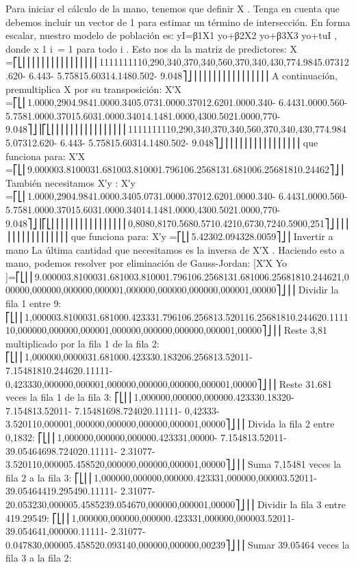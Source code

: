 \documentclass[
]{book}
\begin{document}
Para iniciar el cálculo de la mano, tenemos que definir X . Tenga en cuenta que debemos incluir un vector de 1 para estimar un término de intersección. En forma escalar, nuestro modelo de población es: yI=β1X1 yo+β2X2 yo+β3X3 yo+tuI , donde x 1 i  = 1 para todo i . Esto nos da la matriz de predictores:
X =⎡⎣⎢⎢⎢⎢⎢⎢⎢⎢⎢⎢⎢⎢⎢⎢⎢⎢1111111110,290,340,370,340,560,370,340,430,774.9845.07312.620- 6.443- 5.75815.60314.1480.502- 9.048⎤⎦⎥⎥⎥⎥⎥⎥⎥⎥⎥⎥⎥⎥⎥⎥⎥⎥
A continuación, premultiplica X por su transposición:
X′X =⎡⎣⎢1.0000,2904.9841.0000.3405.0731.0000.37012.6201.0000.340- 6.4431.0000.560- 5.7581.0000.37015.6031.0000.34014.1481.0000,4300.5021.0000,770- 9.048⎤⎦⎥⎡⎣⎢⎢⎢⎢⎢⎢⎢⎢⎢⎢⎢⎢⎢⎢⎢⎢1111111110,290,340,370,340,560,370,340,430,774.9845.07312.620- 6.443- 5.75815.60314.1480.502- 9.048⎤⎦⎥⎥⎥⎥⎥⎥⎥⎥⎥⎥⎥⎥⎥⎥⎥⎥
que funciona para:
X′X =⎡⎣⎢9.000003.8100031.681003.810001.796106.2568131.681006.25681810.24462⎤⎦⎥
También necesitamos X′y :
X′y =⎡⎣⎢1.0000,2904.9841.0000.3405.0731.0000.37012.6201.0000.340- 6.4431.0000.560- 5.7581.0000.37015.6031.0000.34014.1481.0000,4300.5021.0000,770- 9.048⎤⎦⎥⎡⎣⎢⎢⎢⎢⎢⎢⎢⎢⎢⎢⎢⎢⎢⎢⎢⎢0,8080,8170.5680.5710.4210,6730,7240.5900,251⎤⎦⎥⎥⎥⎥⎥⎥⎥⎥⎥⎥⎥⎥⎥⎥⎥⎥
que funciona para:
X′y =⎡⎣⎢5.42302.094328.0059⎤⎦⎥
Invertir a mano
La última cantidad que necesitamos es la inversa de X′X . Haciendo esto a mano, podemos resolver por eliminación de Gauss-Jordan:
{[}X′X \textbar{} Yo {]}=⎡⎣⎢⎢9.000003.8100031.681003.810001.796106.2568131.681006.25681810.244621,000000,000000,000000,000001,000000,000000,000000,000001,00000⎤⎦⎥⎥
Dividir la fila 1 entre 9:
⎡⎣⎢⎢1,000003.8100031.681000.423331.796106.256813.520116.25681810.244620.111110,000000,000000,000001,000000,000000,000000,000001,00000⎤⎦⎥⎥
Reste 3,81 multiplicado por la fila 1 de la fila 2:
⎡⎣⎢⎢1,000000,0000031.681000.423330.183206.256813.52011- 7.15481810.244620.11111- 0,423330,000000,000001,000000,000000,000000,000001,00000⎤⎦⎥⎥
Reste 31.681 veces la fila 1 de la fila 3:
⎡⎣⎢⎢1,000000,000000,000000.423330.18320- 7.154813.52011- 7.15481698.724020.11111- 0,42333- 3.520110,000001,000000,000000,000000,000001,00000⎤⎦⎥⎥
Divida la fila 2 entre 0,1832:
⎡⎣⎢⎢1,000000,000000,000000.423331,00000- 7.154813.52011- 39.05464698.724020.11111- 2.31077- 3.520110,000005.458520,000000,000000,000001,00000⎤⎦⎥⎥
Suma 7,15481 veces la fila 2 a la fila 3:
⎡⎣⎢⎢1,000000,000000,000000.423331,000000,000003.52011- 39.05464419.295490.11111- 2.31077- 20.053230,000005.4585239.054670,000000,000001,00000⎤⎦⎥⎥
Dividir la fila 3 entre 419.29549:
⎡⎣⎢⎢1,000000,000000,000000.423331,000000,000003.52011- 39.054641,000000.11111- 2.31077- 0.047830,000005.458520.093140,000000,000000,00239⎤⎦⎥⎥
Sumar 39.05464 veces la fila 3 a la fila 2:
\end{document}
